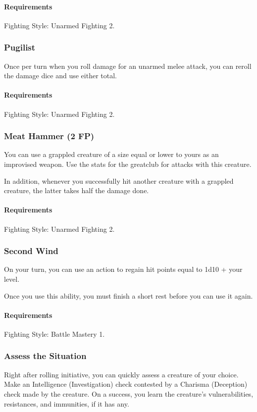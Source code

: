     \paragraph{Requirements} Fighting Style: Unarmed Fighting 2.
\subsubsection{Pugilist} \label{feat::pugilist}
    Once per turn when you roll damage for an unarmed melee attack, you can reroll the damage dice and use either total.
    \paragraph{Requirements} Fighting Style: Unarmed Fighting 2.
\subsubsection{Meat Hammer (2 FP)} \label{feat::meathammer}
    You can use a grappled creature of a size equal or lower to yours as an improvised weapon.
    Use the stats for the greatclub for attacks with this creature.

    In addition, whenever you successfully hit another creature with a grappled creature, the latter takes half the damage done.
    \paragraph{Requirements} Fighting Style: Unarmed Fighting 2.
\subsubsection{Second Wind} \label{feat::secondwind}
    On your turn, you can use an action to regain hit points equal to 1d10 + your level.

    Once you use this ability, you must finish a short rest before you can use it again.
    \paragraph{Requirements} Fighting Style: Battle Mastery 1.
\subsubsection{Assess the Situation} \label{feat::assessthesituation}
    Right after rolling initiative, you can quickly assess a creature of your choice.
    Make an Intelligence (Investigation) check contested by a Charisma (Deception) check made by the creature.
    On a success, you learn the creature's vulnerabilities, resistances, and immunities, if it has any.

